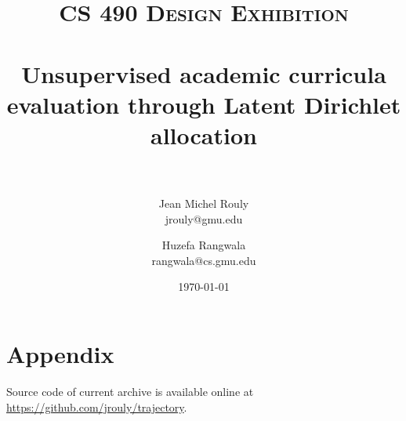 \documentclass[paper=a4, fontsize=11pt]{scrartcl} %
\title{\normalfont\normalsize
\textsc{CS 490 Design Exhibition} \\ [25pt] %
\horrule{0.5pt} \\[0.4cm] %
\huge Unsupervised academic curricula evaluation through Latent Dirichlet
allocation \\ %
\horrule{2pt} \\[0.5cm] %
}
\author{Jean Michel Rouly \\ jrouly@gmu.edu \and Huzefa Rangwala \\ rangwala@cs.gmu.edu} %
\date{\normalsize\today} %
\numberwithin{equation}{section} %
\numberwithin{figure}{section} %
\numberwithin{table}{section} %
\begin{document}
\maketitle %
































\clearpage





\appendix
\section{Appendix}


Source code of current archive is available online at
\href{https://github.com/jrouly/trajectory.git}{https://github.com/jrouly/trajectory}.

\end{document}
